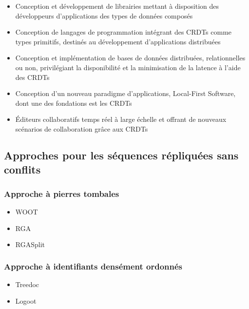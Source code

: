 \documentclass[12pt]{thesul}
\begin{document}
\begin{itemize}
  \item Conception et développement de librairies mettant à disposition des développeurs d'applications des types de données composés \cite{Nicolaescu2015Yjs, Nicolaescu2016YATA, yjsimplem, jsoncrdt2017, automerge}
  \item Conception de langages de programmation intégrant des CRDTs comme types primitifs, destinés au développement d'applications distribuées \cite{Meiklejohn2015Lasp2, DePorre2020cscript}
  \item Conception et implémentation de bases de données distribuées, relationnelles ou non, privilégiant la disponibilité et la minimisation de la latence à l'aide des CRDTs \cite{RiakKV, AntidoteDB, Anna2021, Concordant, yu:hal-02983557}
  \item Conception d'un nouveau paradigme d'applications, Local-First Software, dont une des fondations est les CRDTs \cite{localfirstsoftware2019, pushpin2020}
  \item Éditeurs collaboratifs temps réel à large échelle et offrant de nouveaux scénarios de collaboration grâce aux CRDTs \cite{Nedelec2016CRATE, MUTE2017}
\end{itemize}

\subsection{Approches pour les séquences répliquées sans conflits}
\subsubsection{Approche à pierres tombales}

\begin{itemize}
  \item WOOT \cite{oster:inria-00108523, Weiss_2007, ahmednacer:inria-00629503}
  \item RGA \cite{ROH2011354}
  \item RGASplit \cite{briot:hal-01343941}
\end{itemize}

\subsubsection{Approche à identifiants densément ordonnés}

\begin{itemize}
  \item Treedoc \cite{5158449}
  \item Logoot \cite{WeissICDCS09, weiss:hal-00450416}
\end{itemize}
\end{document}
